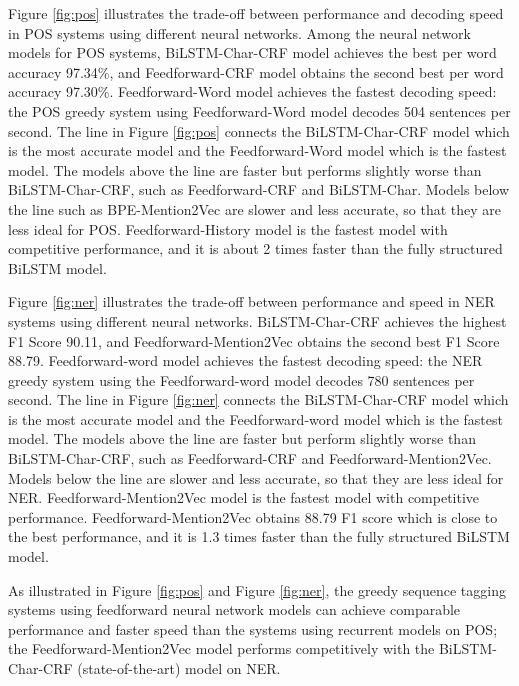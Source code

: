 \documentclass{sfuthesis}
\begin{document}
Figure \ref{fig:pos} illustrates the trade-off between performance and decoding speed in POS systems using different neural networks. Among the neural network models for POS systems, BiLSTM-Char-CRF model achieves the best per word accuracy 97.34\%, and Feedforward-CRF model obtains the second best per word accuracy 97.30\%. Feedforward-Word model achieves the fastest decoding speed: the POS greedy system using Feedforward-Word model decodes 504 sentences per second. The line in Figure \ref{fig:pos} connects the BiLSTM-Char-CRF model which is the most accurate model and the Feedforward-Word model which is the fastest model. The models above the line are faster but performs slightly worse than BiLSTM-Char-CRF, such as Feedforward-CRF and BiLSTM-Char. Models below the line such as BPE-Mention2Vec are slower and less accurate, so that they are less ideal for POS. Feedforward-History model is the fastest model with competitive performance, and it is about 2 times faster than the fully structured BiLSTM model.

Figure \ref{fig:ner} illustrates the trade-off between performance and speed in NER systems using different neural networks. BiLSTM-Char-CRF achieves the highest F1 Score 90.11, and Feedforward-Mention2Vec obtains the second best F1 Score 88.79. Feedforward-word model achieves the fastest decoding speed: the NER greedy system using the Feedforward-word model decodes 780 sentences per second. The line in Figure \ref{fig:ner} connects the BiLSTM-Char-CRF model which is the most accurate model and the Feedforward-word model which is the fastest model. The models above the line are faster but perform slightly worse than BiLSTM-Char-CRF, such as Feedforward-CRF and Feedforward-Mention2Vec. Models below the line are slower and less accurate, so that they are less ideal for NER. Feedforward-Mention2Vec model is the fastest model with competitive performance. Feedforward-Mention2Vec obtains 88.79 F1 score which is close to the best performance, and it is 1.3 times faster than the fully structured BiLSTM model.

As illustrated in Figure \ref{fig:pos} and Figure \ref{fig:ner}, the greedy sequence tagging systems using feedforward neural network models can achieve comparable performance and faster speed than the systems using recurrent models on POS; the Feedforward-Mention2Vec model performs competitively with the BiLSTM-Char-CRF (state-of-the-art) model on NER.
\end{document}
